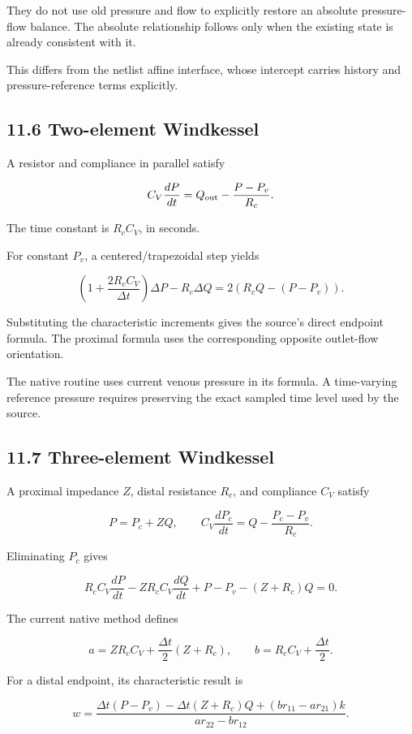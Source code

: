 \documentclass[11pt,a4paper]{article}
\begin{document}
They do not use old pressure and flow to explicitly restore an absolute pressure-flow balance. The absolute relationship follows only when the existing state is already consistent with it.

This differs from the netlist affine interface, whose intercept carries history and pressure-reference terms explicitly.

\subsection{11.6 Two-element Windkessel}
A resistor and compliance in parallel satisfy


\begingroup\small
\[
C_V\frac{dP}{dt}
=Q_{\rm out}-\frac{P-P_v}{R_c}.
\]
\endgroup


The time constant is \(R_cC_V\), in seconds.

For constant \(P_v\), a centered/trapezoidal step yields


\begingroup\small
\[
\left(1+\frac{2R_cC_V}{\Delta t}\right)\Delta P
-R_c\Delta Q
=
2\left(R_cQ-(P-P_v)\right).
\]
\endgroup


Substituting the characteristic increments gives the source's direct endpoint formula. The proximal formula uses the corresponding opposite outlet-flow orientation.

The native routine uses current venous pressure in its formula. A time-varying reference pressure requires preserving the exact sampled time level used by the source.

\subsection{11.7 Three-element Windkessel}
A proximal impedance \(Z\), distal resistance \(R_c\), and compliance \(C_V\) satisfy


\begingroup\small
\[
P=P_c+ZQ,
\qquad
C_V\frac{dP_c}{dt}
=Q-\frac{P_c-P_v}{R_c}.
\]
\endgroup


Eliminating \(P_c\) gives


\begingroup\small
\[
R_cC_V\frac{dP}{dt}
-ZR_cC_V\frac{dQ}{dt}
+P-P_v-(Z+R_c)Q=0.
\]
\endgroup


The current native method defines


\begingroup\small
\[
a=ZR_cC_V+\frac{\Delta t}{2}(Z+R_c),
\qquad
b=R_cC_V+\frac{\Delta t}{2}.
\]
\endgroup


For a distal endpoint, its characteristic result is


\begingroup\small
\[
w=
\frac{
\Delta t(P-P_v)-\Delta t(Z+R_c)Q
+(br_{11}-ar_{21})k
}{
ar_{22}-br_{12}
}.
\]
\endgroup
\end{document}
